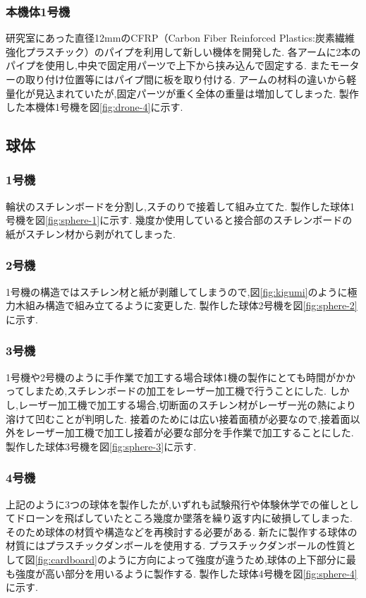 \documentclass[a4paper]{jarticle}
\begin{document}
\subsubsection{本機体1号機}
研究室にあった直径12mmのCFRP（Carbon Fiber Reinforced Plastics:炭素繊維強化プラスチック）のパイプを利用して新しい機体を開発した.
各アームに2本のパイプを使用し,中央で固定用パーツで上下から挟み込んで固定する.
またモーターの取り付け位置等にはパイプ間に板を取り付ける.
アームの材料の違いから軽量化が見込まれていたが,固定パーツが重く全体の重量は増加してしまった.
製作した本機体1号機を図\ref{fig:drone-4}に示す.

\subsection{球体}

\subsubsection{1号機}
輪状のスチレンボードを分割し,スチのりで接着して組み立てた.
製作した球体1号機を図\ref{fig:sphere-1}に示す.
幾度か使用していると接合部のスチレンボードの紙がスチレン材から剥がれてしまった.

\subsubsection{2号機}
1号機の構造ではスチレン材と紙が剥離してしまうので,図\ref{fig:kigumi}のように極力木組み構造で組み立てるように変更した.
製作した球体2号機を図\ref{fig:sphere-2}に示す.

\subsubsection{3号機}
1号機や2号機のように手作業で加工する場合球体1機の製作にとても時間がかかってしまため,スチレンボードの加工をレーザー加工機で行うことにした.
しかし,レーザー加工機で加工する場合,切断面のスチレン材がレーザー光の熱により溶けて凹むことが判明した.
接着のためには広い接着面積が必要なので,接着面以外をレーザー加工機で加工し接着が必要な部分を手作業で加工することにした.
製作した球体3号機を図\ref{fig:sphere-3}に示す.

\subsubsection{4号機}
上記のように3つの球体を製作したが,いずれも試験飛行や体験休学での催しとしてドローンを飛ばしていたところ幾度か墜落を繰り返す内に破損してしまった.
そのため球体の材質や構造などを再検討する必要がある.
新たに製作する球体の材質にはプラスチックダンボールを使用する.
プラスチックダンボールの性質として図\ref{fig:cardboard}のように方向によって強度が違うため,球体の上下部分に最も強度が高い部分を用いるように製作する.
製作した球体4号機を図\ref{fig:sphere-4}に示す.
\end{document}
